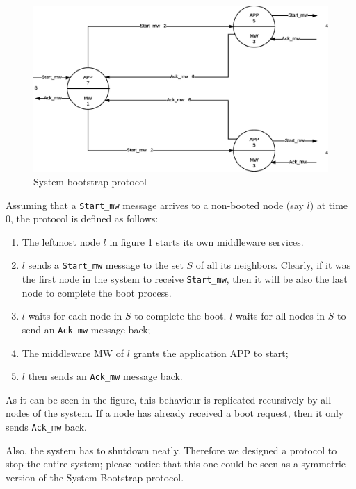 \begin{figure}[H]
  \centering
  \includegraphics[width=\columnwidth]{images/solution/bootstrap.eps}
  \caption{System bootstrap protocol}
  \label{fig:sys-bootstrap-protocol}
\end{figure}

Assuming that a \texttt{Start\_mw} message arrives to a non-booted node (say
$l$) at time 0, the protocol is defined as follows:

\begin{enumerate}
\item The leftmost node $l$ in figure \ref{fig:sys-bootstrap-protocol}
  starts its own middleware services.
\item $l$ sends a \texttt{Start\_mw} message to the set $S$ of all its
  neighbors. Clearly, if it was the first node in the system to receive
  \texttt{Start\_mw}, then it will be also the last node to complete the
  boot process.
\item $l$ waits for each node in $S$ to complete the boot. $l$ waits for all
  nodes in $S$ to send an \texttt{Ack\_mw} message back;
\item The middleware MW of $l$ grants the application APP to start;
\item $l$ then sends an \texttt{Ack\_mw} message back.
\end{enumerate}

As it can be seen in the figure, this behaviour is replicated recursively
by all nodes of the system. If a node has already received a boot request,
then it only sends \texttt{Ack\_mw} back.

Also, the system has to shutdown neatly. Therefore we designed a protocol to
stop the entire system; please notice that this one could be seen as a
symmetric version of the System Bootstrap protocol.

